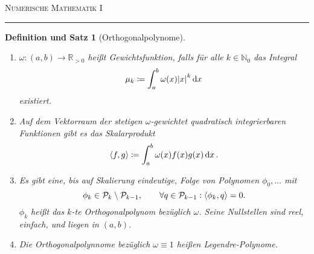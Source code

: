 \documentclass[a4paper]{article}
\newcounter{Sec}
\theoremstyle{marginbreak}
\newtheorem{defsatz}[definition]{Definition und Satz}
\newcommand{\sep}{%
	\rule{\textwidth}{0.3pt}%
	\stepcounter{Sec}%
	}
\newcommand\defas\coloneqq
\DeclarePairedDelimiter\scp{\langle}{\rangle}
\newcommand\poly{\mathcal{P}}
\begin{document}
	\textsc{Numerische Mathematik I}

	\sep
	\begin{defsatz}[Orthogonalpolynome]
		\begin{enumerate}[label=(\alph*)]
			\item
				$\omega\colon(a, b)\to\mathbb{R}_{>0}$ heißt Gewichtsfunktion, falls für alle $k\in\mathbb{N}_0$ das Integral
				\[
					\mu_k\defas\int_a^b\omega(x)\abs{x}^k\dd{x}
				\]
				existiert.
			\item Auf dem Vektorraum der stetigen $\omega$-gewichtet quadratisch integrierbaren Funktionen
				gibt es das Skalarprodukt
				\[
					\scp{f, g}\defas \int_a^b\omega(x)f(x)g(x)\dd{x}.
				\]
			\item Es gibt eine, bis auf Skalierung eindeutige, Folge von Polynomen $\phi_0, \ldots$ mit
				\[
					\phi_k\in\poly_k\setminus\poly_{k-1},\qquad \forall q\in\poly_{k-1}: \scp{\phi_k, q}=0.
				\]
				$\phi_k$ heißt das $k$-te Orthogonalpolynom bezüglich $\omega$. Seine Nullstellen sind reel, einfach, und
				liegen in $(a, b)$.
			\item Die Orthogonalpolynnome bezüglich $\omega\equiv 1$ heißen Legendre-Polynome.
		\end{enumerate}

	\end{defsatz}
\end{document}
